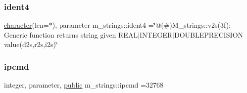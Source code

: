\mbox{\label{namespacem__strings_a19b07bcbc88c40854caf542d11f72cd0}} 
\subsubsection{\texorpdfstring{ident4}{ident4}}
{\footnotesize\ttfamily \hyperlink{option__stopwatch_83_8txt_abd4b21fbbd175834027b5224bfe97e66}{character}(len=$\ast$), parameter m\+\_\+strings\+::ident4 =\char`\"{}@(\#)M\+\_\+strings\+::v2s(3f)\+: Generic function returns string given R\+E\+A\+L$\vert$\+I\+N\+T\+E\+G\+E\+R$\vert$\+D\+O\+U\+B\+L\+E\+P\+R\+E\+C\+I\+S\+I\+O\+N value(d2s,r2s,i2s)\char`\"{}\hspace{0.3cm}{\ttfamily [private]}}

\mbox{\label{namespacem__strings_a40ffeae8c41d579efd77648ffc3d9a19}} 
\subsubsection{\texorpdfstring{ipcmd}{ipcmd}}
{\footnotesize\ttfamily integer, parameter, \hyperlink{M__stopwatch_83_8txt_a2f74811300c361e53b430611a7d1769f}{public} m\+\_\+strings\+::ipcmd =32768}

